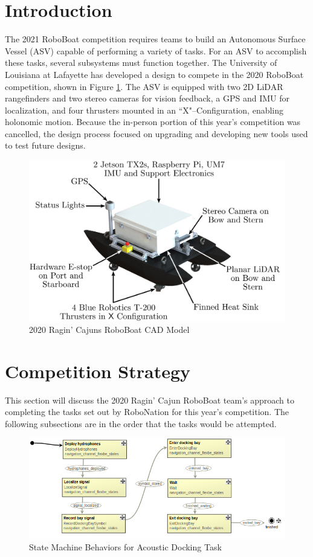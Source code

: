 \documentclass[letterpaper, 12 pt, conference]{ieeeconf}
\begin{document}
\section{Introduction}
The 2021 RoboBoat competition requires teams to build an Autonomous Surface Vessel (ASV) capable of performing a variety of tasks. For an ASV to accomplish these tasks, several subsystems must function together. The University of Louisiana at Lafayette has developed a design to compete in the 2020 RoboBoat competition, shown in Figure \ref{fig:RoboBoat}. The ASV is equipped with two 2D LiDAR rangefinders and two stereo cameras for vision feedback, a GPS and IMU for localization, and four thrusters mounted in an ``X"--Configuration, enabling holonomic motion. Because the in-person portion of this year's competition was cancelled, the design process focused on upgrading and developing new tools used to test future designs.
%
\begin{figure}[tb]
\centering
\includegraphics[width=\columnwidth]{Figures/Catamaran_Final_Render_3.pdf}
\caption{2020 Ragin' Cajuns RoboBoat CAD Model}
\label{fig:RoboBoat}
\end{figure}
%

\section{Competition Strategy}
This section will discuss the 2020 Ragin' Cajun RoboBoat team's approach to completing the tasks set out by RoboNation for this year's competition. The following subsections are in the order that the tasks would be attempted.
%
\begin{figure}[t]
\centering
\vspace{0.05in}
\includegraphics[width=2\columnwidth]{Figures/Acoustic_docking_FSM.png}
\caption{State Machine Behaviors for Acoustic Docking Task}
\label{fig:AcousticDocking}
\end{figure}
%
\end{document}

